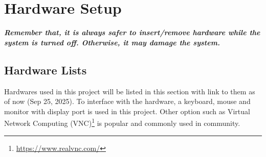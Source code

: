 \documentclass[12pt,hidelinks]{article}
\begin{document}
\section{Hardware Setup}
\vspace{10.5cm}
	\textbf{\emph{Remember that, it is always safer to insert/remove hardware while the system is turned off. Otherwise, it may damage the system.}}

    \subsection{Hardware Lists}
    \label{subsec:hardware_list}
			Hardwares used in this project will be listed in this section with link to them as of now (Sep 25, 2025). To interface with the hardware, a keyboard, mouse and monitor with display port is used in this project. Other option such as Virtual Network Computing (VNC)\footnote{\url{https://www.realvnc.com/}} is popular and commonly used in community.
\end{document}
